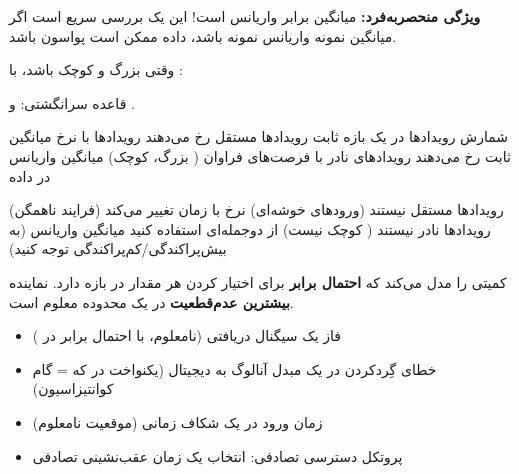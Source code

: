 





\textbf{ویژگی منحصربه‌فرد:} میانگین برابر واریانس است! این یک بررسی سریع است  اگر میانگین نمونه \lr{\mbox{\ensuremath{\approx}}} واریانس نمونه باشد، داده ممکن است پواسون باشد.


وقتی  بزرگ و  کوچک باشد، با :


قاعده سرانگشتی:  و .


\lr{\mbox{\PSyes{}}} شمارش رویدادها در یک بازه ثابت\PSbr{}\lr{\mbox{\PSyes{}}} رویدادها مستقل رخ می‌دهند\PSbr{}\lr{\mbox{\PSyes{}}} رویدادها با نرخ میانگین ثابت رخ می‌دهند\PSbr{}\lr{\mbox{\PSyes{}}} رویدادهای نادر با فرصت‌های فراوان ( بزرگ،  کوچک)\PSbr{}\lr{\mbox{\PSyes{}}} میانگین \lr{\mbox{\ensuremath{\approx}}} واریانس در داده


\lr{\mbox{\PSno{}}} رویدادها مستقل نیستند (ورودهای خوشه‌ای)\PSbr{}\lr{\mbox{\PSno{}}} نرخ با زمان تغییر می‌کند (فرایند ناهمگن)\PSbr{}\lr{\mbox{\PSno{}}} رویدادها نادر نیستند ( کوچک نیست)  از دوجمله‌ای استفاده کنید\PSbr{}\lr{\mbox{\PSno{}}} میانگین \lr{\mbox{\ensuremath{\neq}}} واریانس (به بیش‌پراکندگی/کم‌پراکندگی توجه کنید)



کمیتی را مدل می‌کند که \textbf{احتمال برابر} برای اختیار کردن هر مقدار در بازه \lr{$[a,\, b]$} دارد. نماینده \textbf{بیشترین عدم‌قطعیت} در یک محدوده معلوم است.


\begin{itemize}
\tightlist
\item
  فاز یک سیگنال دریافتی (نامعلوم، با احتمال برابر در \lr{$[0,\, 2\pi)$})
\item
  خطای گِردکردن در یک مبدل آنالوگ به دیجیتال (یکنواخت در  که \lr{$\Delta$} = گام کوانتیزاسیون)
\item
  زمان ورود در یک شکاف زمانی (موقعیت نامعلوم)
\item
  پروتکل دسترسی تصادفی: انتخاب یک زمان عقب‌نشینی تصادفی
\end{itemize}

